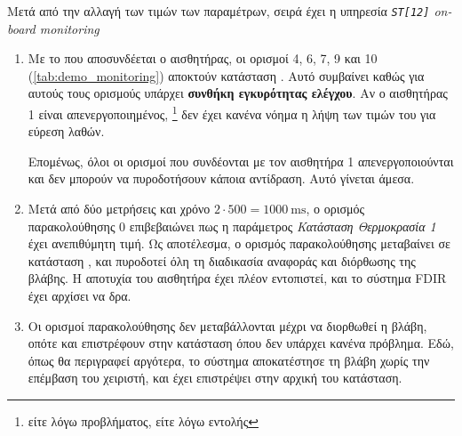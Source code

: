 \documentclass[a4paper,nobib]{tufte-book}
\begin{document}
Μετά από την αλλαγή των τιμών των παραμέτρων, σειρά έχει η υπηρεσία \emph{\texttt{ST[12]} on-board monitoring} 
\begin{enumerate}
	\item Με το που αποσυνδέεται ο αισθητήρας, οι ορισμοί 4, 6, 7, 9 και 10 (\cref{tab:demo_monitoring}) αποκτούν κατάσταση \invalid. Αυτό συμβαίνει καθώς για αυτούς τους ορισμούς υπάρχει \textbf{συνθήκη εγκυρότητας ελέγχου}. Αν ο αισθητήρας 1 είναι απενεργοποιημένος, \footnote{είτε λόγω προβλήματος, είτε λόγω εντολής} δεν έχει κανένα νόημα η λήψη των τιμών του για εύρεση λαθών.
	
	Επομένως, όλοι οι ορισμοί που συνδέονται με τον αισθητήρα 1 απενεργοποιούνται και δεν μπορούν να πυροδοτήσουν κάποια αντίδραση. Αυτό γίνεται άμεσα.
	\item Μετά από δύο μετρήσεις και χρόνο \( 2 \cdot 500 = \SI{1000}{\milli\second} \), ο ορισμός παρακολούθησης 0 επιβεβαιώνει πως η παράμετρος \emph{Κατάσταση Θερμοκρασία 1} έχει ανεπιθύμητη τιμή. Ως αποτέλεσμα, ο ορισμός παρακολούθησης μεταβαίνει σε κατάσταση \unexpected, και πυροδοτεί όλη τη διαδικασία αναφοράς και διόρθωσης της βλάβης. Η αποτυχία του αισθητήρα έχει πλέον εντοπιστεί, και το σύστημα \acs{FDIR} έχει αρχίσει να δρα.
	\item Οι ορισμοί παρακολούθησης δεν μεταβάλλονται μέχρι να διορθωθεί η βλάβη, οπότε και επιστρέφουν στην κατάσταση \ok όπου δεν υπάρχει κανένα πρόβλημα. Εδώ, όπως θα περιγραφεί αργότερα, το σύστημα αποκατέστησε τη βλάβη χωρίς την επέμβαση του χειριστή, και έχει επιστρέψει στην αρχική του κατάσταση.
\end{enumerate}
\end{document}
